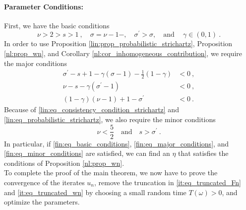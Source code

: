 \documentclass[11pt]{article}
\begin{document}
\paragraph{Parameter Conditions:} First, we have the basic conditions
\begin{equation}\label{fin:eq_basic_conditions}
\nu > 2 > s > 1~, \quad \sigma= \nu - 1 -, \quad \sigma^\prime > \sigma, \quad \text{and} ~ \quad \gamma \in (0,1)~. 
\end{equation}
In order to use Proposition \ref{lin:prop_probabilistic_strichartz}, Proposition \ref{nl:prop_wn}, and Corollary \ref{nl:cor_inhomogeneous_contribution}, we require the major conditions
\begin{equation}\label{fin:eq_major_conditions}
\begin{aligned}
\sigma^\prime -s + 1 - \gamma (\sigma-1) - \frac{1}{2} (1-\gamma)&<0~,\\
\nu - s - \gamma (\sigma^\prime-1) &<0 ~, \\
(1-\gamma) (\nu-1) + 1- \sigma^\prime &<0~. 
\end{aligned}
\end{equation}
Because of \eqref{lin:eq_consistency_condition_strichartz} and \eqref{lin:eq_probabilistic_strichartz}, we also require the minor conditions
\begin{equation}\label{fin:eq_minor_conditions}
\nu < \frac{5}{2} \quad \text{and} \quad s> \sigma^\prime~. 
\end{equation}
In particular, if \eqref{fin:eq_basic_conditions}, \eqref{fin:eq_major_conditions}, and \eqref{fin:eq_minor_conditions} are satisfied, we can find an \( \eta \) that satisfies the conditions of Proposition \ref{nl:prop_wn}. \\

To complete the proof of the main theorem, we now have to prove the convergence of the iterates \( u_n \), remove the truncation in \eqref{it:eq_truncated_Fn} and \eqref{it:eq_truncated_wn} by choosing a small random time \( T(\omega)>0 \), and optimize the parameters. 
\end{document}

